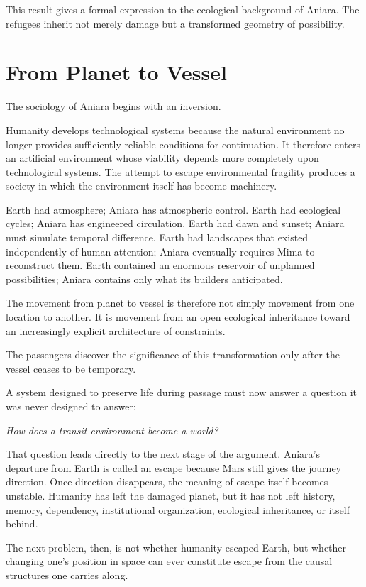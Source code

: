 \documentclass[11pt,oneside]{book}
\theoremstyle{definition}
\theoremstyle{remark}
\begin{document}
This result gives a formal expression to the ecological background of Aniara. The refugees inherit not merely damage but a transformed geometry of possibility.

\section{From Planet to Vessel}

The sociology of Aniara begins with an inversion.

Humanity develops technological systems because the natural environment no longer provides sufficiently reliable conditions for continuation. It therefore enters an artificial environment whose viability depends more completely upon technological systems. The attempt to escape environmental fragility produces a society in which the environment itself has become machinery.

Earth had atmosphere; Aniara has atmospheric control. Earth had ecological cycles; Aniara has engineered circulation. Earth had dawn and sunset; Aniara must simulate temporal difference. Earth had landscapes that existed independently of human attention; Aniara eventually requires Mima to reconstruct them. Earth contained an enormous reservoir of unplanned possibilities; Aniara contains only what its builders anticipated.

The movement from planet to vessel is therefore not simply movement from one location to another. It is movement from an open ecological inheritance toward an increasingly explicit architecture of constraints.

The passengers discover the significance of this transformation only after the vessel ceases to be temporary.

A system designed to preserve life during passage must now answer a question it was never designed to answer:

\begin{center}
\emph{How does a transit environment become a world?}
\end{center}

That question leads directly to the next stage of the argument. Aniara's departure from Earth is called an escape because Mars still gives the journey direction. Once direction disappears, the meaning of escape itself becomes unstable. Humanity has left the damaged planet, but it has not left history, memory, dependency, institutional organization, ecological inheritance, or itself behind.

The next problem, then, is not whether humanity escaped Earth, but whether changing one's position in space can ever constitute escape from the causal structures one carries along.
\end{document}
